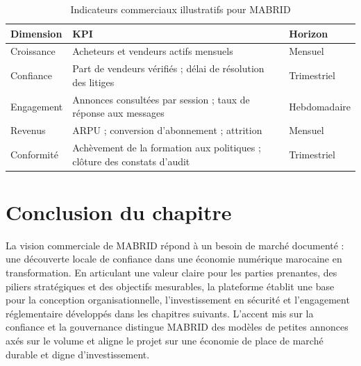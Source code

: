 \begin{table}[H]
  \centering
  \caption{Indicateurs commerciaux illustratifs pour MABRID}
  \label{tab:business-kpis}
  \begin{tabularx}{\textwidth}{@{}lXl@{}}
    \toprule
    \textbf{Dimension} & \textbf{KPI} & \textbf{Horizon} \\
    \midrule
    Croissance & Acheteurs et vendeurs actifs mensuels & Mensuel \\
    Confiance & Part de vendeurs vérifiés ; délai de résolution des litiges & Trimestriel \\
    Engagement & Annonces consultées par session ; taux de réponse aux messages & Hebdomadaire \\
    Revenus & ARPU ; conversion d'abonnement ; attrition & Mensuel \\
    Conformité & Achèvement de la formation aux politiques ; clôture des constats d'audit & Trimestriel \\
    \bottomrule
  \end{tabularx}
\end{table}

\section{Conclusion du chapitre}

La vision commerciale de MABRID répond à un besoin de marché documenté : une découverte locale de confiance dans une économie numérique marocaine en transformation. En articulant une valeur claire pour les parties prenantes, des piliers stratégiques et des objectifs mesurables, la plateforme établit une base pour la conception organisationnelle, l'investissement en sécurité et l'engagement réglementaire développés dans les chapitres suivants. L'accent mis sur la confiance et la gouvernance distingue MABRID des modèles de petites annonces axés sur le volume et aligne le projet sur une économie de place de marché durable et digne d'investissement.
